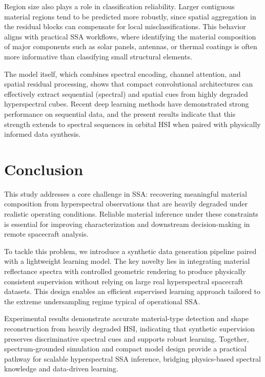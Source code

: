 \documentclass[12pt]{elsarticle}
\begin{document}
Region size also plays a role in classification reliability. Larger contiguous material regions tend to be predicted more robustly, since spatial aggregation in the residual blocks can compensate for local misclassifications. This behavior aligns with practical SSA workflows, where identifying the material composition of major components such as solar panels, antennas, or thermal coatings is often more informative than classifying small structural elements.

The model itself, which combines spectral encoding, channel attention, and spatial residual processing, shows that compact convolutional architectures can effectively extract sequential (spectral) and spatial cues from highly degraded hyperspectral cubes. Recent deep learning methods have demonstrated strong performance on sequential data, and the present results indicate that this strength extends to spectral sequences in orbital HSI when paired with physically informed data synthesis.

\section{Conclusion}

This study addresses a core challenge in SSA: recovering meaningful material composition from hyperspectral observations that are heavily degraded under realistic operating conditions. Reliable material inference under these constraints is essential for improving characterization and downstream decision-making in remote spacecraft analysis.

To tackle this problem, we introduce a synthetic data generation pipeline paired with a lightweight learning model. The key novelty lies in integrating material reflectance spectra with controlled geometric rendering to produce physically consistent supervision without relying on large real hyperspectral spacecraft datasets. This design enables an efficient supervised learning approach tailored to the extreme undersampling regime typical of operational SSA.

Experimental results demonstrate accurate material-type detection and shape reconstruction from heavily degraded HSI, indicating that synthetic supervision preserves discriminative spectral cues and supports robust learning. Together, spectrum-grounded simulation and compact model design provide a practical pathway for scalable hyperspectral SSA inference, bridging physics-based spectral knowledge and data-driven learning.
\end{document}

